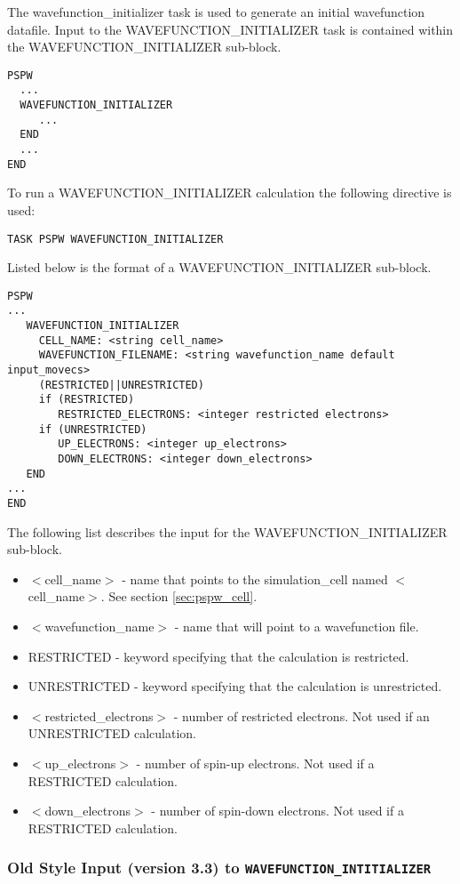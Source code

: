 The wavefunction\_initializer task is used to generate an initial wavefunction
datafile.
Input to the WAVEFUNCTION\_INITIALIZER task is contained
within the WAVEFUNCTION\_INITIALIZER sub-block.
\begin{verbatim}
PSPW
  ...
  WAVEFUNCTION_INITIALIZER
     ...
  END
  ...
END
\end{verbatim}
To run a WAVEFUNCTION\_INITIALIZER calculation the following directive 
is used:
\begin{verbatim}
TASK PSPW WAVEFUNCTION_INITIALIZER
\end{verbatim}
Listed below is the format of a WAVEFUNCTION\_INITIALIZER sub-block.
\begin{verbatim}
PSPW
... 
   WAVEFUNCTION_INITIALIZER
     CELL_NAME: <string cell_name>
     WAVEFUNCTION_FILENAME: <string wavefunction_name default input_movecs>
     (RESTRICTED||UNRESTRICTED)
     if (RESTRICTED)   
        RESTRICTED_ELECTRONS: <integer restricted electrons>
     if (UNRESTRICTED) 
        UP_ELECTRONS: <integer up_electrons>
        DOWN_ELECTRONS: <integer down_electrons>
   END
...
END
\end{verbatim}
The following list describes the input for the WAVEFUNCTION\_INITIALIZER
sub-block.
\begin{itemize}
        \item $<$cell\_name$>$ - name that points 
                to the simulation\_cell named $<$cell\_name$>$.  See section \ref{sec:pspw_cell}.
        \item $<$wavefunction\_name$>$ - name that will point
              to a wavefunction file.
        \item RESTRICTED - keyword specifying that the calculation is restricted.
        \item UNRESTRICTED - keyword specifying that the calculation is unrestricted.

        \item $<$restricted\_electrons$>$ - number of restricted electrons.
               Not used if an UNRESTRICTED calculation. 
         \item $<$up\_electrons$>$ - number of spin-up electrons.
               Not used if a RESTRICTED calculation.
        \item $<$down\_electrons$>$ - number of spin-down electrons.
              Not used if a RESTRICTED calculation.
\end{itemize}

\subsubsection{Old Style Input (version 3.3) to {\tt WAVEFUNCTION\_INTITIALIZER}}

